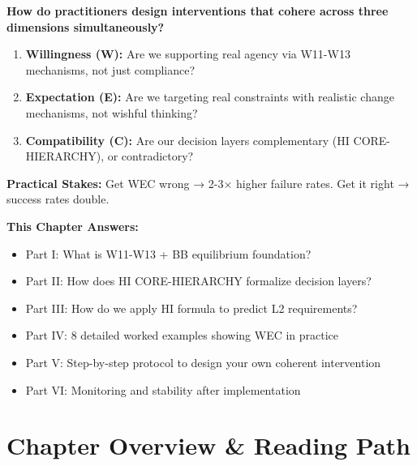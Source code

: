 \documentclass[11pt, a4paper]{article}
\begin{document}

\begin{tcolorbox}[colback=red!5!white, colframe=red!75!black, title=Central Question: The Coherence Problem]

\textbf{How do practitioners design interventions that cohere across three dimensions simultaneously?}

\begin{enumerate}
    \item \textbf{Willingness (W):} Are we supporting real agency via W11-W13 mechanisms, not just compliance?

    \item \textbf{Expectation (E):} Are we targeting real constraints with realistic change mechanisms, not wishful thinking?

    \item \textbf{Compatibility (C):} Are our decision layers complementary (HI CORE-HIERARCHY), or contradictory?
\end{enumerate}

\textbf{Practical Stakes:} Get WEC wrong → 2-3× higher failure rates. Get it right → success rates double.

\textbf{This Chapter Answers:}
\begin{itemize}[nosep]
\item Part I: What is W11-W13 + BB equilibrium foundation?
\item Part II: How does HI CORE-HIERARCHY formalize decision layers?
\item Part III: How do we apply HI formula to predict L2 requirements?
\item Part IV: 8 detailed worked examples showing WEC in practice
\item Part V: Step-by-step protocol to design your own coherent intervention
\item Part VI: Monitoring and stability after implementation
\end{itemize}

\end{tcolorbox}


\section*{Chapter Overview \& Reading Path} \label{sec:ch15-overview}
\end{document}
